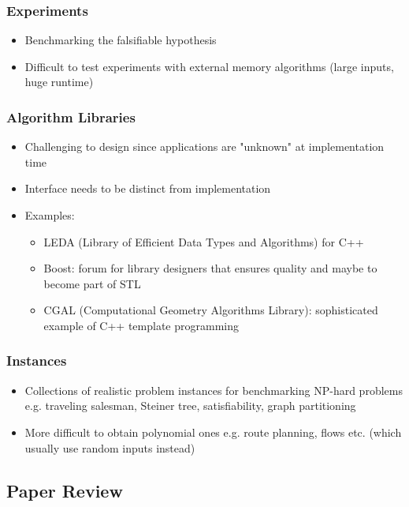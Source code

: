 \subsubsection{Experiments}

\begin{itemize}
    \item Benchmarking the falsifiable hypothesis
    \item Difficult to test experiments with external memory algorithms (large inputs, huge runtime)
\end{itemize}

\subsubsection{Algorithm Libraries}

\begin{itemize}
    \item Challenging to design since applications are "unknown" at implementation time
    \item Interface needs to be distinct from implementation
    \item Examples:
    \begin{itemize}
        \item LEDA (Library of Efficient Data Types and Algorithms) for C++
        \item Boost: forum for library designers that ensures quality and maybe to become part of STL
        \item CGAL (Computational Geometry Algorithms Library): sophisticated example of C++ template programming
    \end{itemize}
\end{itemize}

\subsubsection{Instances}

\begin{itemize}
    \item Collections of realistic problem instances for benchmarking NP-hard problems e.g. traveling salesman, Steiner tree, satisfiability, graph partitioning
    \item More difficult to obtain polynomial ones e.g. route planning, flows etc. (which usually use random inputs instead)
\end{itemize}

\subsection{Paper Review}

